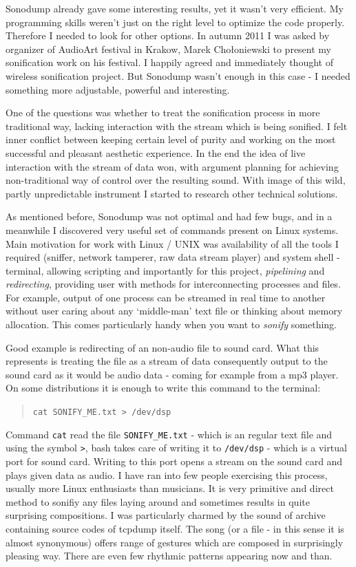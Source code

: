 \documentclass[12pt,a4paper,oneside]{report}
\begin{document}
Sonodump already gave some interesting results, yet it wasn't very efficient. My programming skills weren't just on the right level to optimize the code properly. Therefore I needed to look for other options. In autumn 2011 I was asked by organizer of AudioArt festival in Krakow, Marek Chołoniewski to present my sonification work on his festival. I happily agreed and immediately thought of wireless sonification project. But Sonodump wasn't enough in this case - I needed something more adjustable, powerful and interesting.

One of the questions was whether to treat the sonification process in more traditional way, lacking interaction with the stream which is being sonified. I felt inner conflict between keeping certain level of purity and working on the most successful and pleasant aesthetic experience. In the end the idea of live interaction with the stream of data won, with argument planning for achieving non-traditional way of control over the resulting sound. With image of this wild, partly unpredictable instrument I started to research other technical solutions.

As mentioned before, Sonodump was not optimal and had few bugs, and in a meanwhile I discovered very useful set of commands present on Linux systems. Main motivation for work with Linux / UNIX was availability of all the tools I required (sniffer, network tamperer, raw data stream player) and system shell - terminal, allowing scripting and importantly for this project, \emph{pipelining} and \emph{redirecting}, providing user with methods for interconnecting processes and files. For example, output of one process can be streamed in real time to another without user caring about any `middle-man' text file or thinking about memory allocation. This comes particularly handy when you want to \emph{sonify} something. 

Good example is redirecting of an non-audio file to sound card. What this represents is treating the file as a stream of data consequently output to the sound card as it would be audio data - coming for example from a mp3 player. On some distributions it is enough to write this command to the terminal:
\begin{quotation}
	\texttt{cat SONIFY\_ME.txt > /dev/dsp} 
\end{quotation}

Command \texttt{cat} read the file \texttt{SONIFY\_ME.txt} - which is an regular text file and using the symbol \texttt{>}, bash takes care of writing it to \texttt{/dev/dsp} - which is a virtual port for sound card. Writing to this port opens a stream on the sound card and plays given data as audio. I have ran into few people exercising this process, usually more Linux enthusiasts than musicians. It is very primitive and direct method to sonifiy any files laying around and sometimes results in quite surprising compositions. I was particularly charmed by the sound of archive containing source codes of tcpdump itself. The song (or a file - in this sense it is almost synonymous) offers range of gestures which are composed in surprisingly pleasing way. There are even few rhythmic patterns appearing now and than.
\end{document}
